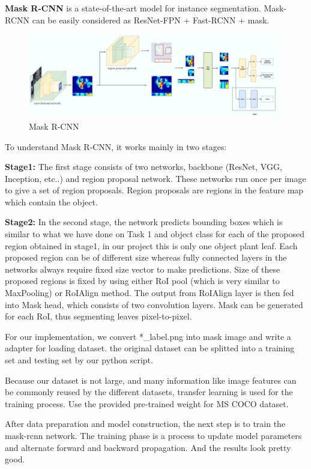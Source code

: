 \documentclass[conference]{IEEEtran}
\begin{document}
\textbf{Mask R-CNN} is a state-of-the-art model for instance segmentation. Mask-RCNN can be easily considered as ResNet-FPN + Fast-RCNN + mask.

\begin{figure}[h!]
\centering
\includegraphics[width=\linewidth]{img/maskrcnn.png}
\caption{Mask R-CNN}
\label{fig_mask-rcnn}
\end{figure}

To understand Mask R-CNN, it works mainly in two stages:

\textbf{Stage1:} The first stage consists of two networks, backbone (ResNet, VGG, Inception, etc..) and region proposal network. These networks run once per image to give a set of region proposals. Region proposals are regions in the feature map which contain the object.

\textbf{Stage2:} In the second stage, the network predicts bounding boxes which is similar to what we have done on Task 1 and object class for each of the proposed region obtained in stage1, in our project this is only one object plant leaf. 
Each proposed region can be of different size whereas fully connected layers in the networks always require fixed size vector to make predictions. Size of these proposed regions is fixed by using either RoI pool (which is very similar to MaxPooling) or RoIAlign method.
The output from RoIAlign layer is then fed into Mask head, which consists of two convolution layers. Mask can be generated for each RoI, thus segmenting leaves pixel-to-pixel.

For our implementation, we convert *\_label.png into mask image and write a adapter for loading dataset.
the original dataset can be splitted into a training set and testing set by our python script.

Because our dataset is not large, and many information like image features can be commonly reused by the different datasets, 
transfer learning \cite{pan2009survey} is used for the training process.
Use the provided pre-trained weight for MS COCO dataset\cite{Lin_2014}.

After data preparation and model construction, the next step is to train the mask-rcnn network.
The training phase is a process to update model parameters and alternate forward and backward propagation.
And the results look pretty good.
\end{document}
